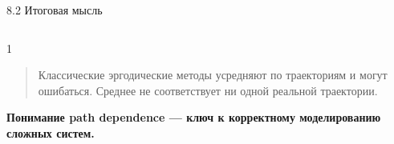 \documentclass[
  ignorenonframetext,
  aspectratio=169,
  russian,
]{beamer}
\begin{document}
\begin{frame}{8.2 Итоговая мысль}
\label{ux438ux442ux43eux433ux43eux432ux430ux44f-ux43cux44bux441ux43bux44c}
\begin{columns}[T]
\begin{column}{1\linewidth}
\begin{quote}
Классические эргодические методы усредняют по траекториям и могут
ошибаться. Среднее не соответствует ни одной реальной траектории.
\end{quote}

\textbf{Понимание path dependence --- ключ к корректному моделированию
сложных систем.}
\end{column}
\end{columns}
\end{frame}
\end{document}
